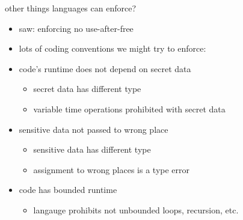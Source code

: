 \begin{frame}{other things languages can enforce?}
    \begin{itemize}
    \item saw: enforcing no use-after-free
    \item lots of coding conventions we might try to enforce:
    \vspace{.5cm}
    \item code's runtime does not depend on secret data
        \begin{itemize}
        \item secret data has different type
        \item variable time operations prohibited with secret data
        \end{itemize}
    \item sensitive data not passed to wrong place
        \begin{itemize}
        \item sensitive data has different type
        \item assignment to wrong places is a type error
        \end{itemize}
    \item code has bounded runtime
        \begin{itemize}
        \item langauge prohibits not unbounded loops, recursion, etc.
        \end{itemize}
    \end{itemize}
\end{frame}
